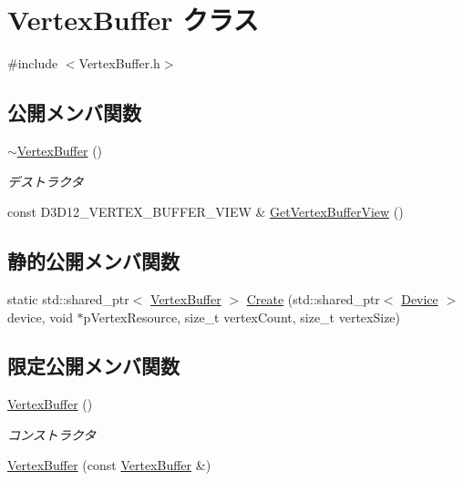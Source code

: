 \hypertarget{class_vertex_buffer}{}\section{Vertex\+Buffer クラス}
\label{class_vertex_buffer}


{\ttfamily \#include $<$Vertex\+Buffer.\+h$>$}

\subsection*{公開メンバ関数}
\begin{DoxyCompactItemize}
\item 
\mbox{\hyperlink{class_vertex_buffer_a5216726fdd43b2ae8e1439e347717fdd}{$\sim$\+Vertex\+Buffer}} ()
\begin{DoxyCompactList}\small\item\em デストラクタ \end{DoxyCompactList}\item 
const D3\+D12\+\_\+\+V\+E\+R\+T\+E\+X\+\_\+\+B\+U\+F\+F\+E\+R\+\_\+\+V\+I\+EW \& \mbox{\hyperlink{class_vertex_buffer_abd6e75355e6ab6a85a2c79780467c12c}{Get\+Vertex\+Buffer\+View}} ()
\end{DoxyCompactItemize}
\subsection*{静的公開メンバ関数}
\begin{DoxyCompactItemize}
\item 
static std\+::shared\+\_\+ptr$<$ \mbox{\hyperlink{class_vertex_buffer}{Vertex\+Buffer}} $>$ \mbox{\hyperlink{class_vertex_buffer_a29dc2a0375049af708962af8db2ba2fd}{Create}} (std\+::shared\+\_\+ptr$<$ \mbox{\hyperlink{class_device}{Device}} $>$ device, void $\ast$p\+Vertex\+Resource, size\+\_\+t vertex\+Count, size\+\_\+t vertex\+Size)
\end{DoxyCompactItemize}
\subsection*{限定公開メンバ関数}
\begin{DoxyCompactItemize}
\item 
\mbox{\hyperlink{class_vertex_buffer_adb25d82a47ad82d5b69a75ac111401b8}{Vertex\+Buffer}} ()
\begin{DoxyCompactList}\small\item\em コンストラクタ \end{DoxyCompactList}\item 
\mbox{\hyperlink{class_vertex_buffer_a5e6393d302e2e7b1ed0c8477298793f3}{Vertex\+Buffer}} (const \mbox{\hyperlink{class_vertex_buffer}{Vertex\+Buffer}} \&)
\end{DoxyCompactItemize}
